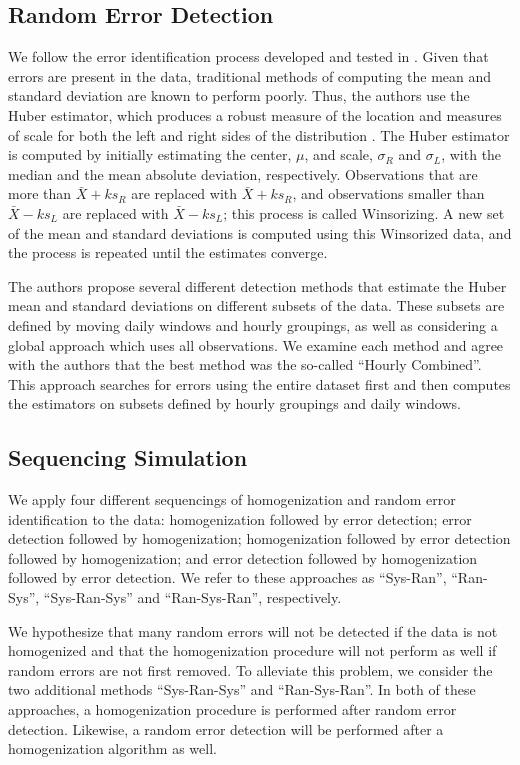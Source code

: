 \documentclass[12pt]{article}
\begin{document}
\begin{doublespacing}
\subsection{Random Error Detection}
We follow the error identification process developed and tested in \cite{bell14}.  Given that errors are present in the data, traditional methods of computing the mean and standard deviation are known to perform poorly.  Thus, the authors use the Huber estimator, which produces a robust measure of the location and measures of scale for both the left and right sides of the distribution \cite{huber11}.  The Huber estimator is computed by initially estimating the center, $\mu$, and scale, $\sigma_R$ and $\sigma_L$, with the median and the mean absolute deviation, respectively.  Observations that are more than $\bar{X}+k s_R$ are replaced with $\bar{X}+ k s_R$, and observations smaller than $\bar{X}-k s_L$ are replaced with $\bar{X}-k s_L$; this process is called Winsorizing.  A new set of the mean and standard deviations is computed using this Winsorized data, and the process is repeated until the estimates converge.

The authors propose several different detection methods that estimate the Huber mean and standard deviations on different subsets of the data.  These subsets are defined by moving daily windows and hourly groupings, as well as considering a global approach which uses all observations.  We examine each method and agree with the authors that the best method was the so-called ``Hourly Combined''.  This approach searches for errors using the entire dataset first and then computes the estimators on subsets defined by hourly groupings and daily windows.

\subsection{Sequencing Simulation}

We apply four different sequencings of homogenization and random error identification to the data: homogenization followed by error detection; error detection followed by homogenization; homogenization followed by error detection followed by homogenization; and error detection followed by homogenization followed by error detection.  We refer to these approaches as ``Sys-Ran'', ``Ran-Sys'', ``Sys-Ran-Sys'' and ``Ran-Sys-Ran'', respectively.

We hypothesize that many random errors will not be detected if the data is not homogenized and that the homogenization procedure will not perform as well if random errors are not first removed.  To alleviate this problem, we consider the two additional methods ``Sys-Ran-Sys'' and ``Ran-Sys-Ran''.  In both of these approaches, a homogenization procedure is performed after random error detection.  Likewise, a random error detection will be performed after a homogenization algorithm as well.


\end{doublespacing}
\end{document}
